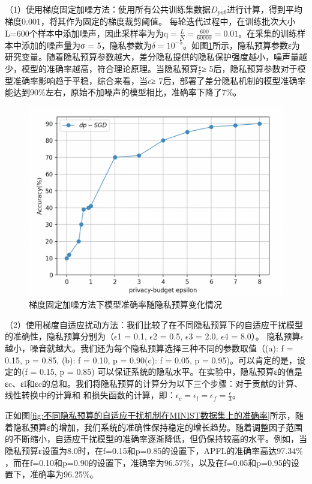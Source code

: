 （1）使用梯度固定加噪方法：使用所有公共训练集数据$D_{p u b}$进行计算，得到平均梯度0.001，将其作为固定的梯度裁剪阈值。
每轮迭代过程中，在训练批次大小L=600个样本中添加噪声，因此采样率为为$\mathrm{q}=\frac{L}{N}=\frac{600}{60000}=0.01$。在采集的训练样本中添加的噪声量为σ = 5，隐私参数为$\delta=10^{-5}$。如图\ref{fig:梯度固定加噪方法下模型准确率随隐私预算变化情况}所示，隐私预算参数ε为研究变量。随着隐私预算参数越大，差分隐私提供的隐私保护强度越小，噪声量越少，模型的准确率越高，符合理论原理。当隐私预算$\frac{\epsilon}{c}$≥ 5后，隐私预算参数对于模型准确率影响趋于平稳，综合来看，当$c$≥ 7后，部署了差分隐私机制的模型准确率能达到90$\%$左右，原始不加噪声的模型相比，准确率下降了7$\%$。
\begin{figure}[!hbt]
\centering
  	\includegraphics[scale=0.4]{fig2/C5/梯度固定}%
	\caption{梯度固定加噪方法下模型准确率随隐私预算变化情况}
  	\label{fig:梯度固定加噪方法下模型准确率随隐私预算变化情况} 
\end{figure}

（2）使用梯度自适应扰动方法：我们比较了在不同隐私预算下的自适应干扰模型的准确性，隐私预算分别为（$\epsilon$1 = 0.1, $\epsilon$2 = 0.5, $\epsilon$3 = 2.0, $\epsilon$4 = 8.0）。
隐私预算$\epsilon$越小，噪音就越大。我们还为每个隐私预算选择三种不同的参数取值（(a): f = 0.15, p = 0.85, (b): f = 0.10, p = 0.90(c): f = 0.05, p = 0.95)。可以肯定的是，设定的(f = 0.15, p = 0.85) 可以保证系统的隐私水平。在实验中，隐私预算ε的值是εc、εl和εc的总和。我们将隐私预算的计算分为以下三个步骤：对于贡献的计算、线性转换中的计算和
和损失函数的计算，即：$\epsilon_{c}=\epsilon_{l}=\epsilon_{f}=\frac{\epsilon}{3}$。

正如图\ref{fig:不同隐私预算的自适应干扰机制在MINIST数据集上的准确率}所示，随着隐私预算ε的增加，我们系统的准确性保持稳定的增长趋势。随着调整因子范围的不断缩小，自适应干扰模型的准确率逐渐降低，但仍保持较高的水平。例如，当隐私预算ε设置为8.0时，在f=0.15和p=0.85的设置下，APFL的准确率高达97.34$\%$，而在f=0.10和p=0.90的设置下，准确率为96.57$\%$，以及在f=0.05和p=0.95的设置下，准确率为96.25$\%$。

